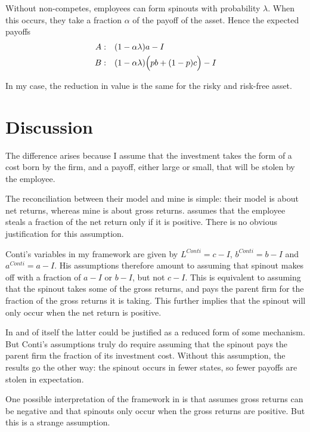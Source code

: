 \documentclass[12pt,english]{article}
\theoremstyle{remark}
\begin{document}
Without non-competes, employees can form spinouts with probability $\lambda$. When this occurs, they take a fraction $\alpha$ of the payoff of the asset. Hence the expected payoffs
\begin{align*}
A:&\textrm{ \space \space} (1-\alpha\lambda)a - I \\
B:&\textrm{ \space \space} (1-\alpha\lambda) \Big(pb + (1-p)c\Big) - I
\end{align*}

In my case, the reduction in value is the same for the risky and risk-free asset.

\section{Discussion}

The difference arises because I assume that the investment takes the form of a cost born by the firm, and a payoff, either large or small, that will be stolen by the employee. 

The reconciliation between their model and mine is simple: their model is about net returns, whereas mine is about gross returns. \cite{conti_non-competition_2014} assumes that the employee steals a fraction of the net return only if it is positive. There is no obvious justification for this assumption. 

Conti's variables in my framework are given by $L^{Conti} = c - I$, $b^{Conti} = b - I$ and $a^{Conti} = a - I$. His assumptions therefore amount to assuming that spinout makes off with a fraction of $a - I$ or $b - I$, but not $c - I$. This is equivalent to assuming that the spinout takes some of the gross returns, and pays the parent firm for the fraction of the gross returns it is taking. This further implies that the spinout will only occur when the net return is positive. 

In and of itself the latter could be justified as a reduced form of some mechanism. But Conti's assumptions truly do require assuming that the spinout pays the parent firm the fraction of its investment cost. Without this assumption, the results go the other way: the spinout occurs in fewer states, so fewer payoffs are stolen in expectation. 

One possible interpretation of the framework in \cite{conti_non-competition_2014} is that assumes gross returns can be negative and that spinouts only occur when the gross returns are positive. But this is a strange assumption. 





\end{document}
